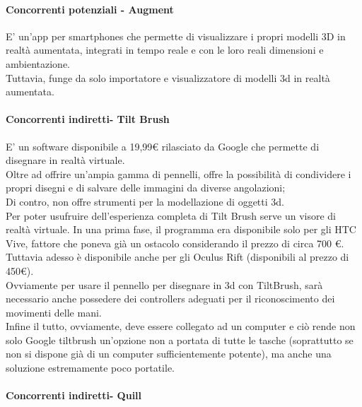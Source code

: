 \documentclass[11pt,fleqn]{book} %
\begin{document}
\paragraph{Concorrenti potenziali - Augment}
E' un'app per smartphones che permette di visualizzare i propri modelli 3D in realtà aumentata, integrati in tempo reale e con le loro reali dimensioni e ambientazione. \\
Tuttavia, funge da solo importatore e visualizzatore di modelli 3d in realtà aumentata.


\paragraph{Concorrenti indiretti- Tilt Brush}
E' un software disponibile a 19,99€ rilasciato da Google che permette di disegnare in realtà virtuale. \\
Oltre ad offrire un'ampia gamma di pennelli, offre la possibilità di condividere i propri disegni e di salvare delle immagini da diverse angolazioni; \\Di contro, non offre strumenti per la modellazione di oggetti 3d.\\
Per poter usufruire dell’esperienza completa di Tilt Brush serve un visore di realtà virtuale. In una prima fase, il programma era disponibile solo per gli HTC Vive, fattore che poneva già un ostacolo considerando il prezzo di circa 700 €. Tuttavia adesso è disponibile anche per gli Oculus Rift (disponibili al prezzo di 450€). \\
Ovviamente per usare il pennello per disegnare in 3d con TiltBrush, sarà necessario anche possedere dei controllers adeguati per il riconoscimento dei movimenti delle mani.\\
Infine il tutto, ovviamente, deve essere collegato ad un computer e ciò rende non solo Google tiltbrush un'opzione non a portata di tutte le tasche (soprattutto se non si dispone già di un computer sufficientemente potente), ma anche una soluzione estremamente poco portatile.\\



\paragraph{Concorrenti indiretti- Quill}



				
\end{document}
